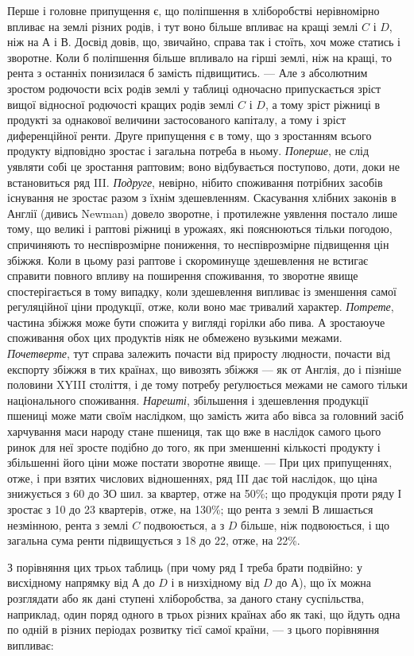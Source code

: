 
Перше і головне припущення є, що поліпшення в хліборобстві нерівномірно
впливає на землі різних родів, і тут воно більше впливає на кращі землі
$C$ і $D$, ніж на $А$ і $В$. Досвід довів, що, звичайно, справа так і стоїть, хоч може
статись і зворотне. Коли б поліпшення більше впливало на гірші землі, ніж на
кращі, то рента з останніх понизилася б замість підвищитись. — Але з абсолютним
зростом родючости всіх родів землі у таблиці одночасно припускається зріст
вищої відносної родючості кращих родів землі $C$ і $D$, а тому зріст ріжниці в продукті за однакової
величини застосованого капіталу, а тому і зріст диференційної ренти.
Друге припущення є в тому, що з зростанням всього продукту відповідно зростає і загальна потреба в
ньому. \emph{Поперше}, не слід уявляти собі це зростання раптовим; воно відбувається поступово, доти, доки
не встановиться ряд III. \emph{Подруге}, невірно, нібито споживання потрібних засобів існування не зростає разом з їхнім
здешевленням. Скасування хлібних законів в Англії (дивись Newman) довело зворотне, і протилежне
уявлення постало лише тому, що великі і раптові ріжниці в урожаях, які пояснюються тільки погодою,
спричиняють то неспіврозмірне пониження, то неспіврозмірне підвищення цін збіжжя.
Коли в цьому разі раптове і скороминуще здешевлення не встигає справити повного впливу на поширення
споживання, то зворотне явище спостерігається в тому випадку, коли здешевлення випливає із зменшення
самої регуляційної ціни продукції, отже, коли воно має тривалий характер. \emph{Потрете}, частина збіжжя
може бути спожита у вигляді горілки або пива. А зростаюуче споживання обох цих продуктів ніяк не
обмежено вузькими межами. \emph{Почетверте}, тут справа залежить почасти від приросту людности, почасти
від експорту збіжжя в тих країнах, що вивозять збіжжя — як от Англія, до і
пізніше половини XYIII століття, і де тому потребу реґулюється межами не самого
тільки національного споживання. \emph{Нарешті}, збільшення і здешевлення
продукції пшениці може мати своїм наслідком, що замість жита або вівса за
головний засіб харчування маси народу стане пшениця, так що вже в наслідок
самого цього ринок для неї зросте подібно до того, як при зменшенні кількості
продукту і збільшенні його ціни може постати зворотне явище. — При цих припущеннях, отже, і при
взятих числових відношеннях, ряд III дає той наслідок,
що ціна знижується з 60 до ЗО шил. за квартер, отже на 50\%; що продукція проти ряду І зростає з 10
до 23 квартерів, отже, на 130\%; що рента з землі $В$ лишається незмінною, рента з землі $C$
подвоюється, а з $D$ більше, ніж подвоюється, і що загальна сума ренти підвищується з 18 до 22, отже, на 22\%.

З порівняння цих трьох таблиць (при чому ряд I треба брати подвійно:
у висхідному напрямку від $А$ до $D$ і в низхідному від $D$ до $А$), що їх можна
розглядати або як дані ступені хліборобства, за даного стану суспільства, наприклад,
один поряд одного в трьох різних країнах або як такі, що йдуть одна по одній в різних періодах
розвитку тієї самої країни, — з цього порівняння випливає:
